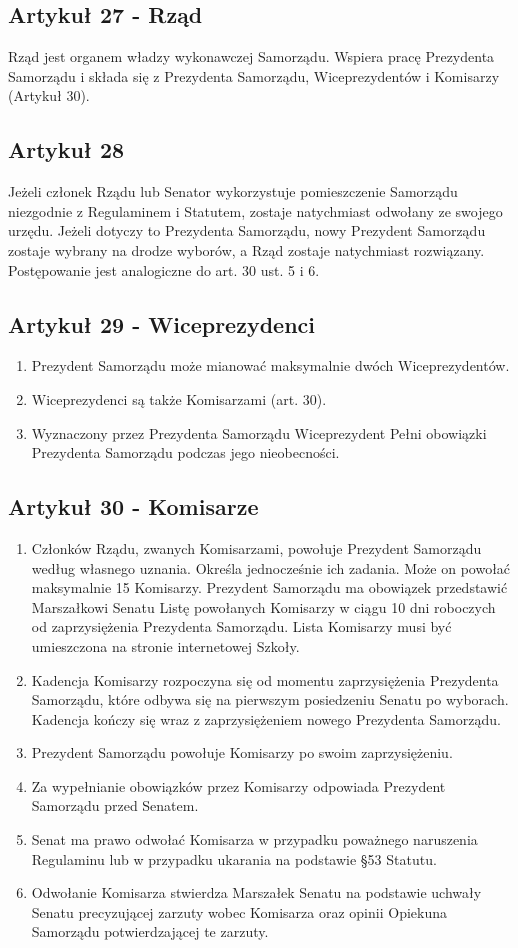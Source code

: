 \documentclass[14pt]{article}
\newenvironment{ustepy}{%
	\begin{enumerate}[leftmargin=1.5em, itemindent=1pt, labelwidth=1em, itemsep=5pt]
	}{%
	\end{enumerate}
}
\begin{document}
\subsection*{Artykuł 27 - Rząd}
Rząd jest organem władzy wykonawczej Samorządu. Wspiera pracę Prezydenta Samorządu i składa się z Prezydenta Samorządu, Wiceprezydentów i Komisarzy (Artykuł 30).

\subsection*{Artykuł 28}
Jeżeli członek Rządu lub Senator wykorzystuje pomieszczenie Samorządu niezgodnie z Regulaminem i Statutem, zostaje natychmiast odwołany ze swojego urzędu. Jeżeli dotyczy to Prezydenta Samorządu, nowy Prezydent Samorządu zostaje wybrany na drodze wyborów, a Rząd zostaje natychmiast rozwiązany. Postępowanie jest analogiczne do art. 30 ust. 5 i 6.

\subsection*{Artykuł 29 - Wiceprezydenci}
\begin{ustepy}
	\item Prezydent Samorządu może mianować maksymalnie dwóch Wiceprezydentów. 
	\item Wiceprezydenci są także Komisarzami (art. 30).
	\item Wyznaczony przez Prezydenta Samorządu Wiceprezydent Pełni obowiązki Prezydenta Samorządu podczas jego nieobecności.
\end{ustepy}

\subsection*{Artykuł 30 - Komisarze}
\begin{ustepy}
	\item Członków Rządu, zwanych Komisarzami, powołuje Prezydent Samorządu według własnego uznania. Określa jednocześnie ich zadania. Może on powołać maksymalnie 15 Komisarzy. Prezydent Samorządu ma obowiązek przedstawić Marszałkowi Senatu Listę powołanych Komisarzy w ciągu 10 dni roboczych od zaprzysiężenia Prezydenta Samorządu. Lista Komisarzy musi być umieszczona na stronie internetowej Szkoły.
	\item Kadencja Komisarzy rozpoczyna się od momentu zaprzysiężenia Prezydenta Samorządu, które odbywa się na pierwszym posiedzeniu Senatu po wyborach. Kadencja kończy się wraz z zaprzysiężeniem nowego Prezydenta Samorządu.
	\item Prezydent Samorządu powołuje Komisarzy po swoim zaprzysiężeniu.
	\item Za wypełnianie obowiązków przez Komisarzy odpowiada Prezydent Samorządu przed Senatem.
	\item Senat ma prawo odwołać Komisarza w przypadku poważnego naruszenia Regulaminu lub w przypadku ukarania na podstawie §53 Statutu.
	\item Odwołanie Komisarza stwierdza Marszałek Senatu na podstawie uchwały Senatu precyzującej zarzuty wobec Komisarza oraz opinii Opiekuna Samorządu potwierdzającej te zarzuty.
\end{ustepy}
\end{document}
